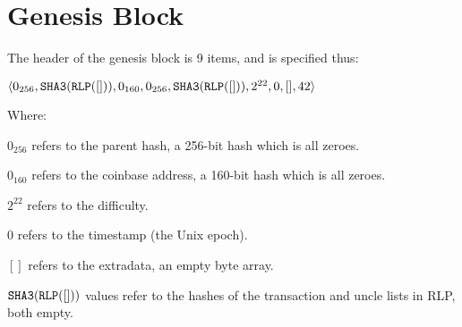 \documentclass[9pt,oneside]{amsart}
\begin{document}
\section{Genesis Block}\label{app:genesis}

The header of the genesis block is 9 items, and is specified thus:

$\langle 0_{256}, \mathtt{\tiny SHA3}(\mathtt{\tiny RLP}([])), 0_{160}, 0_{256}, \mathtt{\tiny SHA3}(\mathtt{\tiny RLP}([])), 2^{22}, 0, [], 42 \rangle$

Where:

$0_{256}$ refers to the parent hash, a 256-bit hash which is all zeroes.

$0_{160}$ refers to the coinbase address, a 160-bit hash which is all zeroes.

$2^{22}$ refers to the difficulty.

0 refers to the timestamp (the Unix epoch).

$[]$ refers to the extradata, an empty byte array.

$\mathtt{\tiny SHA3}(\mathtt{\tiny RLP}([]))$ values refer to the hashes of the transaction and uncle lists in RLP, both empty.
\end{document}
